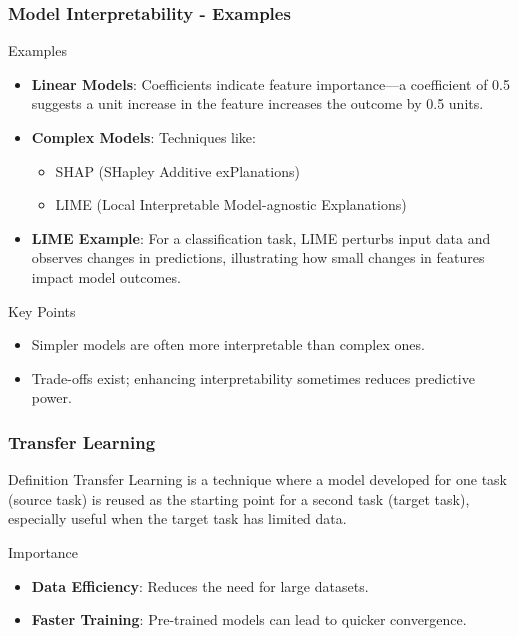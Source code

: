 \documentclass[aspectratio=169]{beamer}
\begin{document}
\begin{frame}[fragile]
    \frametitle{Model Interpretability - Examples}
    \begin{block}{Examples}
        \begin{itemize}
            \item \textbf{Linear Models}: Coefficients indicate feature importance—a coefficient of 0.5 suggests a unit increase in the feature increases the outcome by 0.5 units.
            \item \textbf{Complex Models}: Techniques like:
            \begin{itemize}
                \item SHAP (SHapley Additive exPlanations)
                \item LIME (Local Interpretable Model-agnostic Explanations)
            \end{itemize}
            \item \textbf{LIME Example}: For a classification task, LIME perturbs input data and observes changes in predictions, illustrating how small changes in features impact model outcomes.
        \end{itemize}
    \end{block}

    \begin{block}{Key Points}
        \begin{itemize}
            \item Simpler models are often more interpretable than complex ones.
            \item Trade-offs exist; enhancing interpretability sometimes reduces predictive power.
        \end{itemize}
    \end{block}
\end{frame}

\begin{frame}[fragile]
    \frametitle{Transfer Learning}
    \begin{block}{Definition}
        Transfer Learning is a technique where a model developed for one task (source task) is reused as the starting point for a second task (target task), especially useful when the target task has limited data.
    \end{block}
    
    \begin{block}{Importance}
        \begin{itemize}
            \item \textbf{Data Efficiency}: Reduces the need for large datasets.
            \item \textbf{Faster Training}: Pre-trained models can lead to quicker convergence.
        \end{itemize}
    \end{block}
\end{frame}
\end{document}
